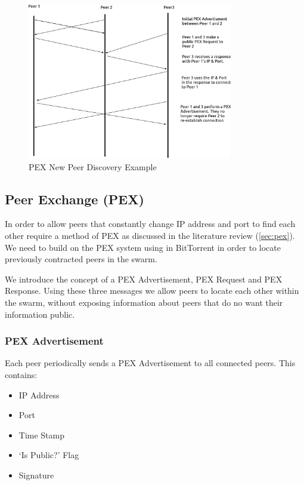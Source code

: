\documentclass[11pt, a4paper, twocolumn, twoside]{report}
\begin{document}
\begin{figure}[!ht]
 \centering
 \includegraphics[width=0.8\textwidth]{pex-new-peer}
 \caption{PEX New Peer Discovery Example}
 \label{fig:pex-new-peer}
\end{figure}

\subsection{Peer Exchange (PEX)}

In order to allow peers that constantly change IP address and port to find each other require a method of PEX as discussed in the literature review (\ref{sec:pex}). We need to build on the PEX system using in BitTorrent in order to locate previously contracted peers in the swarm.

We introduce the concept of a PEX Advertisement, PEX Request and PEX Response. Using these three messages we allow peers to locate each other within the swarm, without exposing information about peers that do no want their information public.

\subsubsection{PEX Advertisement}

Each peer periodically sends a PEX Advertisement to all connected peers. This contains:

\begin{itemize}
 \item IP Address
 \item Port
 \item Time Stamp
 \item `Is Public?' Flag
 \item Signature
\end{itemize}
\end{document}
